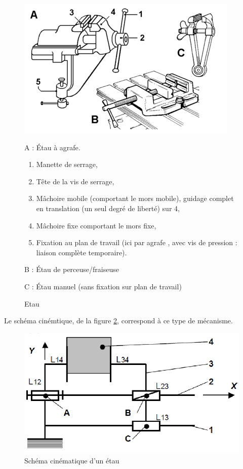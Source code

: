 \begin{figure}[htbp]
\begin{minipage}[c]{.3\linewidth}
\begin{center}
\includegraphics[width=\linewidth]{img/etau_img.png}
\caption{Etau}
\label{fig:image5}
\end{center}
\end{minipage}
\hfill
\begin{minipage}[c]{.69\linewidth}
A : Étau à agrafe.
\begin{enumerate}
 \item Manette de serrage,
 \item Tête de la vis de serrage,
 \item Mâchoire mobile (comportant le mors mobile), guidage complet en translation (un seul degré de liberté) sur 4,
 \item Mâchoire fixe comportant le mors fixe,
 \item Fixation au plan de travail (ici par \og agrafe \fg, avec vis de pression : liaison complète temporaire).
\end{enumerate}
B : Étau de perceuse/fraiseuse

C : Étau manuel (sans fixation sur plan de travail)
\end{minipage}
\end{figure}

Le schéma cinémtique, de la figure \ref{fig:image6}, correspond à ce type de mécanisme.

\begin{figure}[!h]
\begin{center}
\includegraphics[width=0.5\linewidth]{img/schema_cin_etau.png}
\caption{Schéma cinématique d'un étau}
\label{fig:image6}
\end{center}
\end{figure}

